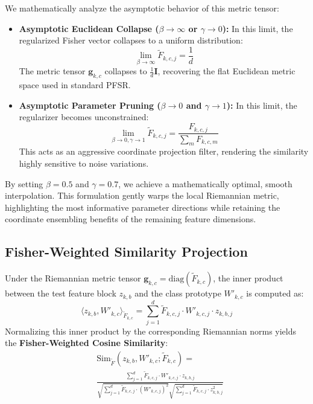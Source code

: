 We mathematically analyze the asymptotic behavior of this metric tensor:
\begin{itemize}\setlength{\itemsep}{0.5pt}\setlength{\parskip}{0pt}
    \item \textbf{Asymptotic Euclidean Collapse ($\beta \to \infty$ or $\gamma \to 0$):} In this limit, the regularized Fisher vector collapses to a uniform distribution:
    \begin{equation}
    \lim_{\beta \to \infty} \tilde{F}_{k, c, j} = \frac{1}{d}
    \end{equation}
    The metric tensor $\mathbf{g}_{k, c}$ collapses to $\frac{1}{d} \mathbf{I}$, recovering the flat Euclidean metric space used in standard PFSR.
    
    \item \textbf{Asymptotic Parameter Pruning ($\beta \to 0$ and $\gamma \to 1$):} In this limit, the regularizer becomes unconstrained:
    \begin{equation}
    \lim_{\beta \to 0, \gamma \to 1} \tilde{F}_{k, c, j} = \frac{F_{k, c, j}}{\sum_m F_{k, c, m}}
    \end{equation}
    This acts as an aggressive coordinate projection filter, rendering the similarity highly sensitive to noise variations.
\end{itemize}
By setting $\beta = 0.5$ and $\gamma = 0.7$, we achieve a mathematically optimal, smooth interpolation. This formulation gently warps the local Riemannian metric, highlighting the most informative parameter directions while retaining the coordinate ensembling benefits of the remaining feature dimensions.

\subsection{Fisher-Weighted Similarity Projection}
Under the Riemannian metric tensor $\mathbf{g}_{k, c} = \text{diag}(\tilde{F}_{k, c})$, the inner product between the test feature block $z_{k, b}$ and the class prototype $W'_{k, c}$ is computed as:
\begin{equation}
\langle z_{k, b}, W'_{k, c} \rangle_{\tilde{F}_{k, c}} = \sum_{j=1}^d \tilde{F}_{k, c, j} \cdot W'_{k, c, j} \cdot z_{k, b, j}
\end{equation}
Normalizing this inner product by the corresponding Riemannian norms yields the \textbf{Fisher-Weighted Cosine Similarity}:
\begin{equation}
\begin{split}
&\text{Sim}_{\tilde{F}}(z_{k, b}, W'_{k, c}; \tilde{F}_{k, c}) = \\
&\frac{\sum_{j=1}^d \tilde{F}_{k, c, j} \cdot W'_{k, c, j} \cdot z_{k, b, j}}{\sqrt{\sum_{j=1}^d \tilde{F}_{k, c, j} \cdot (W'_{k, c, j})^2} \sqrt{\sum_{j=1}^d \tilde{F}_{k, c, j} \cdot z_{k, b, j}^2}}
\end{split}
\end{equation}

